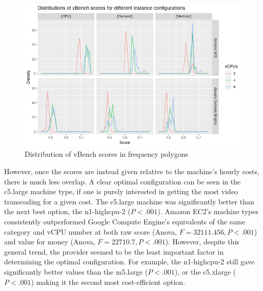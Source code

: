 \documentclass{article}
\begin{document}
\begin{figure}
  \centering
  \includegraphics[scale=0.7]{vbench_dists}
  \caption{Distribution of vBench scores in frequency polygons}
  \label{fig:vBench-dists}
\end{figure}

However, once the scores are instead given relative to the machine's hourly costs, there is much less overlap. A clear optimal configuration can be seen in the c5.large machine type, if one is purely interested in getting the most video transcoding for a given cost. The c5.large machine was significantly better than the next best option, the n1-highcpu-2 ($P < .001$). Amazon EC2's  machine types consistently outperformed Google Compute Engine's equivalents of the same category and vCPU number at both raw score (Anova, $F = 32111.456, P < .001$) and value for money (Anova, $F = 22710.7, P < .001$). However, despite this general trend, the provider seemed to be the least important factor in determining the optimal configuration. For example, the n1-highcpu-2 still gave significantly better values than the m5.large ($P < .001$), or the c5.xlarge ($P < .001$) making it the second most cost-efficient option. 
\end{document}
